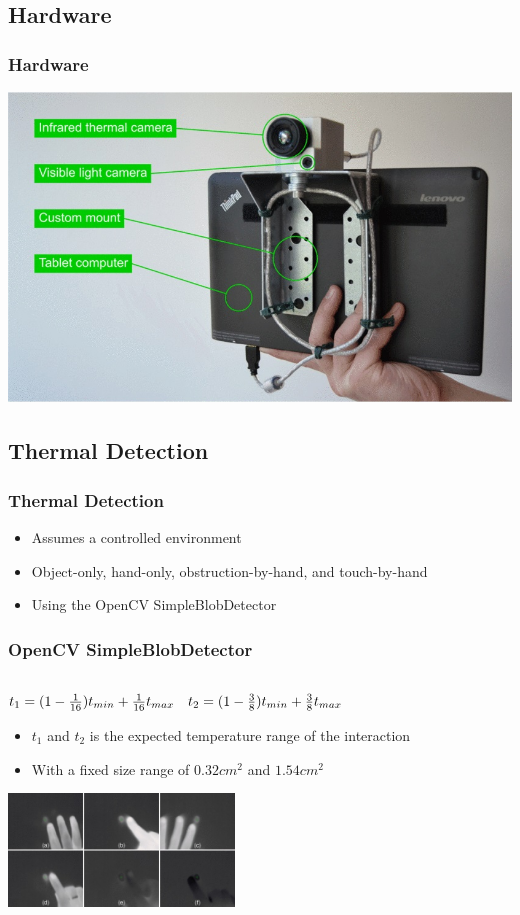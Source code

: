 \documentclass{beamer}
\begin{document}
\subsection{Hardware}
\begin{frame}
\frametitle{Hardware}	
	\includegraphics[width=\textwidth]{../Sample_paper/images/Hardware2}
\end{frame}

\subsection{Thermal Detection}
\begin{frame}
\frametitle{Thermal Detection}
	\begin{itemize}
		\item Assumes a controlled environment
		\item Object-only, hand-only, obstruction-by-hand, and touch-by-hand
		\item Using the OpenCV SimpleBlobDetector
	\end{itemize}
\end{frame}

\begin{frame}
\frametitle{OpenCV SimpleBlobDetector}
\begin{center}
	\(
\begin{matrix} \\
 t_{1}=(1-{1\over 16})t_{ min}+{1\over 16}t_{ max} & t_{2}=(1-{3\over 8})t_{ min}+{3\over 8}t_{ max}\cr 
 \end{matrix} 
\)
\end{center}
	\begin{itemize}
		\item \(t_{1}\) and \(t_{2}\) is the expected temperature range of the interaction
		\item With a fixed size range of \(0.32cm^2\) and \(1.54cm^2\)
	\end{itemize}
	\begin{center}
\includegraphics[width=6cm]{images/Thermal}
\end{center}
\end{frame}
\end{document}
